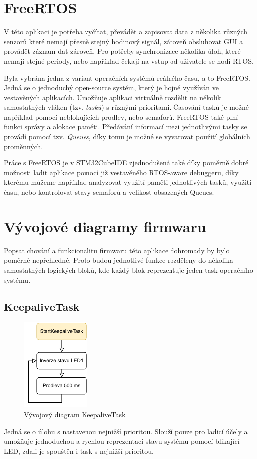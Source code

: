 \section{FreeRTOS}
V této aplikaci je potřeba vyčítat, převádět a zapisovat data z několika různých senzorů které nemají přesně stejný hodinový signál, zároveň obsluhovat \ac{GUI} a provádět záznam dat zároveň. Pro potřeby synchronizace několika úloh, které nemají stejné periody, nebo například čekají na vstup od uživatele se hodí \ac{RTOS}.

Byla vybrána jedna z variant operačních systémů reálného času, a to FreeRTOS. Jedná se o jednoduchý open-source systém, který je hojně využíván ve vestavěných aplikacích. Umožňuje aplikaci virtuálně rozdělit na několik samostatných vláken (tzv. \emph{tasků}) s různými prioritami. Časování tasků je možné například pomocí neblokujících prodlev, nebo semaforů. FreeRTOS také plní funkci správy a alokace paměti. Předávání informací mezi jednotlivými tasky se provádí pomocí tzv. \emph{Queues}, díky tomu je možné se vyvarovat použití globálních proměnných. \cite{Zhu2011}

Práce s FreeRTOS je v STM32CubeIDE zjednodušená také díky poměrně dobré možnosti ladit aplikace pomocí již vestavěného RTOS-aware debuggeru, díky kterému můžeme například analyzovat využití paměti jednotlivých tasků, využití času, nebo kontrolovat stavy semaforů a velikost obsazených Queues. 

\section{Vývojové diagramy firmwaru}
Popsat chování a funkcionalitu firmwaru této aplikace dohromady by bylo poměrně nepřehledné. Proto budou jednotlivé funkce rozděleny do několika samostatných logických bloků, kde každý blok reprezentuje jeden task operačního systému.

\subsection{KeepaliveTask}
\begin{figure}[h]
    \centering
    \includegraphics[width=0.3\textwidth]{obrazky/KeepaliveTask}
    \caption{Vývojový diagram KeepaliveTask}
\end{figure}
Jedná se o úlohu s nastavenou nejnižší prioritou. Slouží pouze pro ladicí účely a umožňuje jednoduchou a rychlou reprezentaci stavu systému pomocí blikající LED, zdali je spouštěn i task s nejnižší prioritou.
